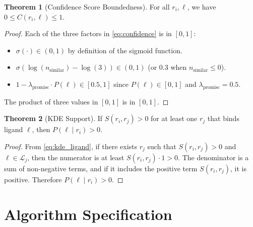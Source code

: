 \documentclass[12pt,oneside]{article}
\theoremstyle{definition}
\newtheorem{theorem}{Theorem}[section]
\newcommand{\sigmoid}{\sigma}
\begin{document}
\begin{theorem}[Confidence Score Boundedness]
\label{thm:confidence_bounded}
For all $r_i, \ell$, we have $0 \leq C(r_i, \ell) \leq 1$.
\end{theorem}

\begin{proof}
Each of the three factors in \eqref{eq:confidence} is in $[0, 1]$:
\begin{itemize}[nosep]
\item $\sigmoid(\cdot) \in (0, 1)$ by definition of the sigmoid function.
\item $\sigmoid(\log(n_{\text{similar}}) - \log(3)) \in (0, 1)$ (or $0.3$ when $n_{\text{similar}} \leq 0$).
\item $1 - \lambda_{\text{promisc}} \cdot P(\ell) \in [0.5, 1]$ since $P(\ell) \in [0, 1]$ and $\lambda_{\text{promisc}} = 0.5$.
\end{itemize}
The product of three values in $[0, 1]$ is in $[0, 1]$.
\end{proof}

\begin{theorem}[KDE Support]
\label{thm:kde_support}
If $S(r_i, r_j) > 0$ for at least one $r_j$ that binds ligand $\ell$, then $P(\ell \mid r_i) > 0$.
\end{theorem}

\begin{proof}
From \eqref{eq:kde_ligand}, if there exists $r_j$ such that $S(r_i, r_j) > 0$ and $\ell \in \mathcal{L}_j$, then the numerator is at least $S(r_i, r_j) \cdot 1 > 0$. The denominator is a sum of non-negative terms, and if it includes the positive term $S(r_i, r_j)$, it is positive. Therefore $P(\ell \mid r_i) > 0$.
\end{proof}

\section{Algorithm Specification}
\end{document}
